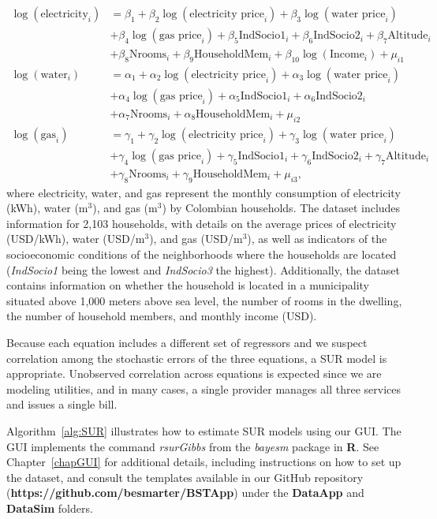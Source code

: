 \begin{align*}
	\log(\text{electricity}_i) & = \beta_1 + \beta_2\log(\text{electricity price}_i)+\beta_3\log(\text{water price}_i)\\
	&+\beta_4\log(\text{gas price}_i)+\beta_5\text{IndSocio1}_i+\beta_6\text{IndSocio2}_i+\beta_7\text{Altitude}_i\\
	&+\beta_8\text{Nrooms}_i+\beta_9\text{HouseholdMem}_i+\beta_{10}\log(\text{Income}_i)+\mu_{i1}\\
	\log(\text{water}_i) & = \alpha_1 + \alpha_2\log(\text{electricity price}_i)+\alpha_3\log(\text{water price}_i)\\
	&+\alpha_4\log(\text{gas price}_i)+\alpha_5\text{IndSocio1}_i+\alpha_6\text{IndSocio2}_i\\
	&+\alpha_7\text{Nrooms}_i+\alpha_8\text{HouseholdMem}_i+\mu_{i2}\\
	\log(\text{gas}_i) & = \gamma_1 + \gamma_2\log(\text{electricity price}_i)+\gamma_3\log(\text{water price}_i)\\
	&+\gamma_4\log(\text{gas price}_i)+\gamma_5\text{IndSocio1}_i+\gamma_6\text{IndSocio2}_i+\gamma_7\text{Altitude}_i\\
	&+\gamma_8\text{Nrooms}_i+\gamma_9\text{HouseholdMem}_i+\mu_{i3},
\end{align*} 
where electricity, water, and gas represent the monthly consumption of electricity (kWh), water (m$^3$), and gas (m$^3$) by Colombian households. The dataset includes information for 2,103 households, with details on the average prices of electricity (USD/kWh), water (USD/m$^3$), and gas (USD/m$^3$), as well as indicators of the socioeconomic conditions of the neighborhoods where the households are located (\textit{IndSocio1} being the lowest and \textit{IndSocio3} the highest). Additionally, the dataset contains information on whether the household is located in a municipality situated above 1,000 meters above sea level, the number of rooms in the dwelling, the number of household members, and monthly income (USD).

Because each equation includes a different set of regressors and we suspect correlation among the stochastic errors of the three equations, a SUR model is appropriate. Unobserved correlation across equations is expected since we are modeling utilities, and in many cases, a single provider manages all three services and issues a single bill.

Algorithm~\ref{alg:SUR} illustrates how to estimate SUR models using our GUI. The GUI implements the command \textit{rsurGibbs} from the \textit{bayesm} package in \textbf{R}. See Chapter~\ref{chapGUI} for additional details, including instructions on how to set up the dataset, and consult the templates available in our GitHub repository (\textbf{https://github.com/besmarter/BSTApp}) under the \textbf{DataApp} and \textbf{DataSim} folders.

